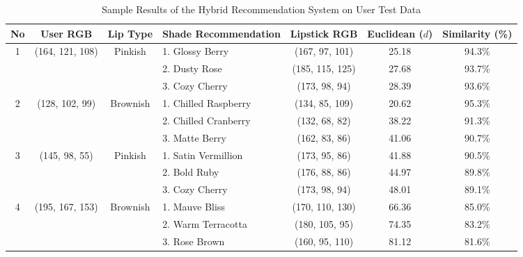 \documentclass[10pt,a4paper]{article}
\begin{document}
\begin{table}[htbp]
  \centering
  \caption{Sample Results of the Hybrid Recommendation System on User Test Data}
  \label{tab:hasil_rekomendasi}
  \fontsize{8.5pt}{10.5pt}\selectfont
  \begin{tabular}{ccclccc}
    \toprule
    \textbf{No} & \textbf{User RGB} & \textbf{Lip Type} & \textbf{Shade Recommendation} & \textbf{Lipstick RGB} & \textbf{Euclidean ($d$)} & \textbf{Similarity (\%)} \\
    \midrule
    1 & (164, 121, 108) & Pinkish  & 1. Glossy Berry     & (167, 97, 101)  & 25.18 & 94.3\% \\
      &                 &          & 2. Dusty Rose       & (185, 115, 125) & 27.68 & 93.7\% \\
      &                 &          & 3. Cozy Cherry      & (173, 98, 94)   & 28.39 & 93.6\% \\
    \midrule
    2 & (128, 102, 99)  & Brownish & 1. Chilled Raspberry& (134, 85, 109)  & 20.62 & 95.3\% \\
      &                 &          & 2. Chilled Cranberry& (132, 68, 82)   & 38.22 & 91.3\% \\
      &                 &          & 3. Matte Berry      & (162, 83, 86)   & 41.06 & 90.7\% \\
    \midrule
    3 & (145, 98, 55)   & Pinkish  & 1. Satin Vermillion & (173, 95, 86)   & 41.88 & 90.5\% \\
      &                 &          & 2. Bold Ruby        & (176, 88, 86)   & 44.97 & 89.8\% \\
      &                 &          & 3. Cozy Cherry      & (173, 98, 94)   & 48.01 & 89.1\% \\
    \midrule
    4 & (195, 167, 153) & Brownish & 1. Mauve Bliss      & (170, 110, 130) & 66.36 & 85.0\% \\
      &                 &          & 2. Warm Terracotta  & (180, 105, 95)  & 74.35 & 83.2\% \\
      &                 &          & 3. Rose Brown       & (160, 95, 110)  & 81.12 & 81.6\% \\
    \bottomrule
  \end{tabular}
\end{table}
\end{document}
